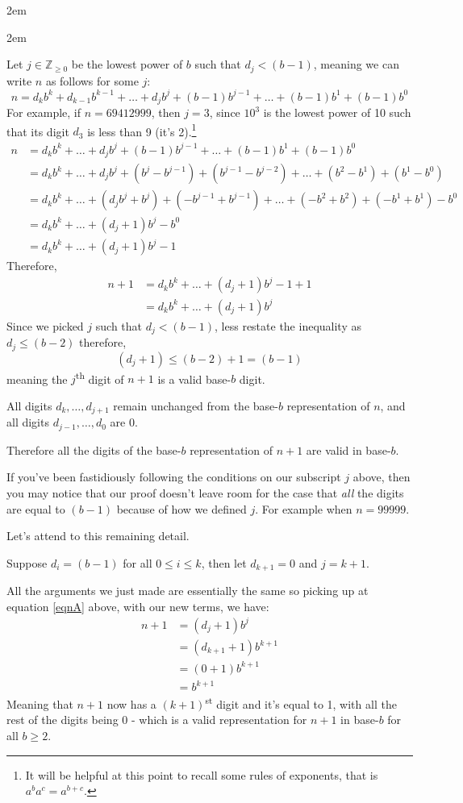 \documentclass{article}
\newenvironment{jprIn}{\begin{adjustwidth}{2em}{}}{\end{adjustwidth}}
\begin{document}
\begin{jprIn}
\begin{jprIn}

Let $j\in \mathbb{Z}_{\ge 0}$ be the lowest power of $b$ such that $d_j<(b-1)$,
meaning we can write $n$ as follows for some $j$:
\[n = d_kb^k+d_{k-1}b^{k-1}+\dots+d_jb^j+(b-1)b^{j-1}+\dots+(b-1)b^1+(b-1)b^0\]
For example,
if $n=69412999$,
then $j=3$,
since $10^3$ is the lowest power of 10 such that its digit $d_3$ is less than 9 (it's 2).\footnote{It will
be helpful at this point to recall some rules of exponents, that is $a^ba^c=a^{b+c}$.}
\begin{align*}
n &=d_kb^k+\dots+d_jb^j+(b-1)b^{j-1}+\dots+(b-1)b^1+(b-1)b^0\\
&= d_kb^k+\dots+d_jb^j+(b^j-b^{j-1})+(b^{j-1}-b^{j-2})+\dots+(b^2-b^1)+(b^1-b^0)\\
&= d_kb^k+\dots+(d_jb^j+b^j)+(-b^{j-1}+b^{j-1})+\dots+(-b^2+b^2)+(-b^1+b^1)-b^0\\
&= d_kb^k+\dots+(d_j+1)b^j-b^0\\
&= d_kb^k+\dots+(d_j+1)b^j-1
\end{align*}
Therefore,
\begin{align}
n+1 &=d_kb^k+\dots+(d_j+1)b^j-1+1 \nonumber \\
&= d_kb^k+\dots+(d_j+1)b^j \label{eqnA}
\end{align}
Since we picked $j$ such that $d_j<(b-1)$,
less restate the inequality as\\
$d_j\le(b-2)$ therefore,
\[(d_j+1)\le(b-2)+1=(b-1)\]
meaning the $j$\textsuperscript{th} digit of $n+1$ is a valid base-$b$ digit.

All digits $d_k,\dots,{}d_{j+1}$ remain unchanged from the base-$b$ representation of $n$,
and all digits $d_{j-1},\dots{},d_0$ are 0.

Therefore all the digits of the base-$b$ representation of $n+1$ are valid in base-$b$.
\bigskip

If you've been fastidiously following the conditions on our subscript $j$ above, then
you may notice that
our proof doesn't leave room for the case that \emph{all} the digits are equal to $(b-1)$ because of
how we defined $j$. For example when $n=99999$.

Let's attend to this remaining detail.

Suppose $d_i=(b-1)$ for all $0\le{}i\le{}k$, then let $d_{k+1}=0$ and $j=k+1$.

All the arguments we just made are essentially the same so picking up at equation \eqref{eqnA} above, with our new terms, we have:
\begin{align*}
n+1 &=(d_j+1)b^j\\
&=(d_{k+1}+1)b^{k+1}\\
&=(0+1)b^{k+1}\\
&=b^{k+1}
\end{align*}
Meaning that $n+1$ now has a $(k+1)$\textsuperscript{st} digit and it's equal to 1,
with all the rest of the digits being 0 - which is a valid representation for $n+1$ in base-$b$ for all $b\ge2$.


\end{jprIn}
\end{jprIn}
\end{document}
